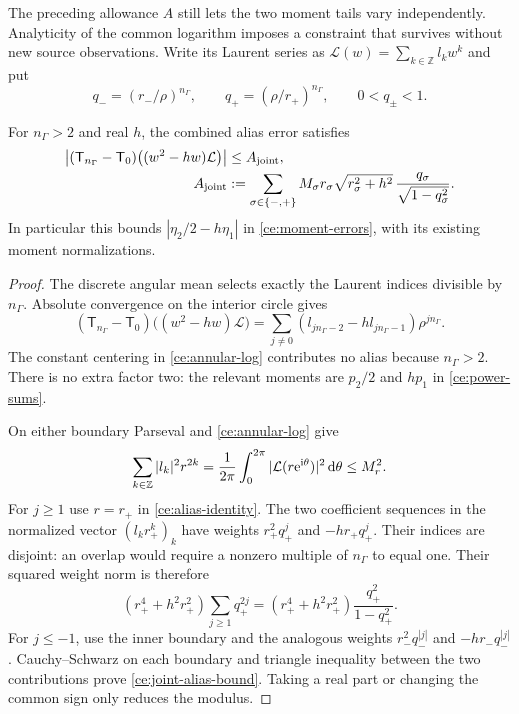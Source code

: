 The preceding allowance $A$ still lets the two moment tails vary
independently. Analyticity of the common logarithm imposes a constraint
that survives without new source observations. Write its Laurent series
as $\mathcal L(w)=\sum_{k\in\mathbb Z}l_kw^k$ and put
\begin{equation}
 q_-=(r_-/\rho)^{n_\Gamma},\qquad
 q_+=(\rho/r_+)^{n_\Gamma},\qquad 0<q_\pm<1.
 \label{ce:alias-ratios}
\end{equation}

\begin{theorem}
\label{ce:joint-alias}
For $n_\Gamma>2$ and real $h$, the combined alias error satisfies
\begin{align}
 \left|(\mathsf T_{n_\Gamma}-\mathsf T_0)
                  \bigl((w^2-hw)\mathcal L\bigr)\right|
 &\le A_{\rm joint},\notag\\
 A_{\rm joint}
 &:=\sum_{\sigma\in\{-,+\}}M_\sigma r_\sigma
        \sqrt{r_\sigma^2+h^2}\,
        \frac{q_\sigma}{\sqrt{1-q_\sigma^2}}.
 \label{ce:joint-alias-bound}
\end{align}
In particular this bounds $|\eta_2/2-h\eta_1|$ in
\eqref{ce:moment-errors}, with its existing moment normalizations.
\end{theorem}
\begin{proof}
The discrete angular mean selects exactly the Laurent indices divisible
by $n_\Gamma$. Absolute convergence on the interior circle gives
\begin{equation}
 (\mathsf T_{n_\Gamma}-\mathsf T_0)
          \bigl((w^2-hw)\mathcal L\bigr)
 =\sum_{j\ne0}(l_{jn_\Gamma-2}-h l_{jn_\Gamma-1})
                    \rho^{jn_\Gamma}.
 \label{ce:alias-identity}
\end{equation}
The constant centering in \eqref{ce:annular-log} contributes no alias
because $n_\Gamma>2$. There is no extra factor two: the relevant
moments are $p_2/2$ and $hp_1$ in \eqref{ce:power-sums}.

On either boundary Parseval and \eqref{ce:annular-log} give
\begin{equation}
 \sum_{k\in\mathbb Z}|l_k|^2r^{2k}
 =\frac1{2\pi}\int_0^{2\pi}|\mathcal L(r\mathrm e^{\mathrm i\theta})|^2\,\mathrm d\theta
 \le M_r^2.
 \label{ce:parseval}
\end{equation}
For $j\ge1$ use $r=r_+$ in \eqref{ce:alias-identity}. The two
coefficient sequences in the normalized vector $(l_kr_+^k)_k$ have
weights $r_+^2q_+^j$ and $-hr_+q_+^j$. Their indices are disjoint:
an overlap would require a nonzero multiple of $n_\Gamma$ to equal
one. Their squared weight norm is therefore
\[
 (r_+^4+h^2r_+^2)\sum_{j\ge1}q_+^{2j}
 =(r_+^4+h^2r_+^2)\frac{q_+^2}{1-q_+^2}.
\]
For $j\le-1$, use the inner boundary and the analogous weights
$r_-^2q_-^{|j|}$ and $-hr_-q_-^{|j|}$. Cauchy--Schwarz on each
boundary and triangle inequality between the two contributions prove
\eqref{ce:joint-alias-bound}. Taking a real part or changing the common
sign only reduces the modulus.
\end{proof}

